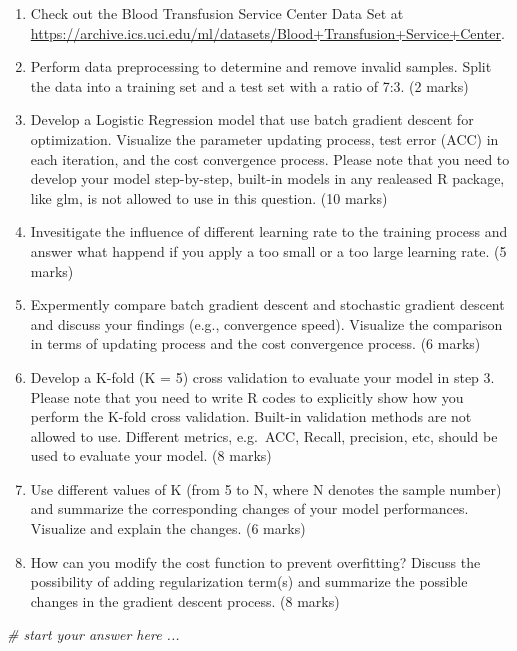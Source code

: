 \documentclass[
]{article}
\newenvironment{Shaded}{\begin{snugshade}}{\end{snugshade}}
\newcommand{\CommentTok}[1]{\textcolor[rgb]{0.56,0.35,0.01}{\textit{#1}}}
\providecommand{\tightlist}{%
  \setlength{\itemsep}{0pt}\setlength{\parskip}{0pt}}
\begin{document}
\begin{enumerate}
\def\labelenumi{\arabic{enumi}.}
\tightlist
\item
  Check out the Blood Transfusion Service Center Data Set at
  \url{https://archive.ics.uci.edu/ml/datasets/Blood+Transfusion+Service+Center}.
\item
  Perform data preprocessing to determine and remove invalid samples.
  Split the data into a training set and a test set with a ratio of 7:3.
  (2 marks)
\item
  Develop a Logistic Regression model that use batch gradient descent
  for optimization. Visualize the parameter updating process, test error
  (ACC) in each iteration, and the cost convergence process. Please note
  that you need to develop your model step-by-step, built-in models in
  any realeased R package, like glm, is not allowed to use in this
  question. (10 marks)
\item
  Invesitigate the influence of different learning rate to the training
  process and answer what happend if you apply a too small or a too
  large learning rate. (5 marks)
\item
  Expermently compare batch gradient descent and stochastic gradient
  descent and discuss your findings (e.g., convergence speed). Visualize
  the comparison in terms of updating process and the cost convergence
  process. (6 marks)
\item
  Develop a K-fold (K = 5) cross validation to evaluate your model in
  step 3. Please note that you need to write R codes to explicitly show
  how you perform the K-fold cross validation. Built-in validation
  methods are not allowed to use. Different metrics, e.g.~ACC, Recall,
  precision, etc, should be used to evaluate your model. (8 marks)
\item
  Use different values of K (from 5 to N, where N denotes the sample
  number) and summarize the corresponding changes of your model
  performances. Visualize and explain the changes. (6 marks)
\item
  How can you modify the cost function to prevent overfitting? Discuss
  the possibility of adding regularization term(s) and summarize the
  possible changes in the gradient descent process. (8 marks)
\end{enumerate}

\begin{Shaded}
\begin{Highlighting}[]
\CommentTok{# start your answer here ...}
\end{Highlighting}
\end{Shaded}
\end{document}
